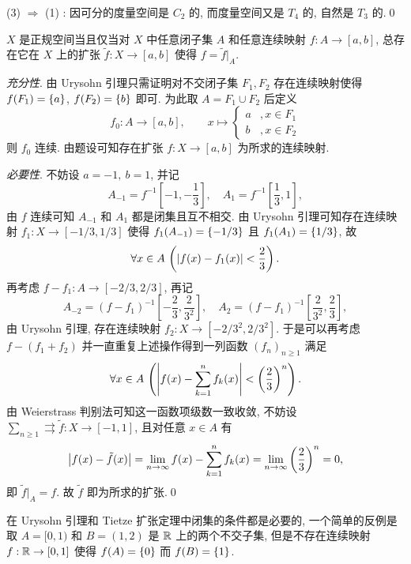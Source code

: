     (3) $ \Rightarrow $ (1) : 因可分的度量空间是 $ C_2 $ 的, 而度量空间又是 $ T_4 $ 的, 自然是 $ T_3 $ 的.\qed

    \begin{Theorem}
        $ X $ 是正规空间当且仅当对 $ X $ 中任意闭子集 $ A $ 和任意连续映射 $ f : A\to[a,b] $, 总存在它在 $ X $ 上的扩张 $ \tilde{f} : X\to[a,b] $ 使得 $ f=\tilde{f}|_A $.
    \end{Theorem}
    \begin{Proof}
        \textsl{充分性}. 由 Urysohn 引理只需证明对不交闭子集 $ F_1, F_2 $ 存在连续映射使得 $ f(F_1)=\left\{ a \right\} $, $ f(F_2)=\left\{ b \right\} $ 即可. 为此取 $ A=F_1\cup F_2 $ 后定义
        \[
            f_0 : A\to [a,b],\qquad x\mapsto\begin{cases}
                a & ,x\in F_1\\ b & ,x\in F_2
            \end{cases}
        \]
        则 $ f_0 $ 连续. 由题设可知存在扩张 $ f : X\to[a,b] $ 为所求的连续映射.

        \textsl{必要性}. 不妨设 $ a=-1,\ b=1 $, 并记
        \[
            A_{-1}=f^{-1}\left[-1,-\frac{1}{3}\right],\quad A_1=f^{-1}\left[\frac{1}{3},1\right],
        \]
        由 $ f $ 连续可知 $ A_{-1} $ 和 $ A_1 $ 都是闭集且互不相交. 由 Urysohn 引理可知存在连续映射 $ f_1 : X\to[-1/3,1/3] $ 使得 $ f_1(A_{-1})=\left\{ -1/3 \right\} $ 且 $ f_1(A_1)=\left\{ 1/3 \right\} $, 故
        \[
            \forall x\in A\,\left( \left| f(x)-f_1(x) \right| <\frac{2}{3} \right).
        \]
        再考虑 $ f-f_1 : A\to[-2/3,2/3] $, 再记
        \[
            A_{-2}=(f-f_1)^{-1}\left[-\frac{2}{3},\frac{2}{3^2}\right],\quad A_2=(f-f_1)^{-1}\left[\frac{2}{3^2},\frac{2}{3}\right],
        \]
        由 Urysohn 引理, 存在连续映射 $ f_2 : X\to[-2/3^2,2/3^2] $. 于是可以再考虑 $ f-(f_1+f_2) $ 并一直重复上述操作得到一列函数 $ (f_n)_{n\geqslant 1} $ 满足
        \[
            \forall x\in A\,\left( \left| f(x)-\sum_{k=1}^nf_k(x) \right| <\left(\frac{2}{3}\right)^n \right).
        \]
        由 Weierstrass 判别法可知这一函数项级数一致收敛, 不妨设 $ \sum_{n\geqslant 1}\rightrightarrows\tilde{f} : X\to[-1,1] $, 且对任意 $ x\in A $ 有
        \[
            \left| f(x)-\tilde{f}(x) \right| =\lim_{n\to\infty}f(x)-\sum_{k=1}^nf_k(x)=\lim_{n\to\infty}\left(\frac{2}{3}\right)^n=0,
        \]
        即 $ \tilde{f}|_A=f $. 故 $ \tilde{f} $ 即为所求的扩张.\qed
    \end{Proof}

    在 Urysohn 引理和 Tietze 扩张定理中闭集的条件都是必要的, 一个简单的反例是取 $ A=[0,1) $ 和 $ B=(1,2) $ 是 $ \mathbb{R} $ 上的两个不交子集, 但是不存在连续映射 $ f : \mathbb{R}\to[0,1] $ 使得 $ f(A)=\left\{ 0 \right\} $ 而 $ f(B)=\left\{ 1 \right\} $.